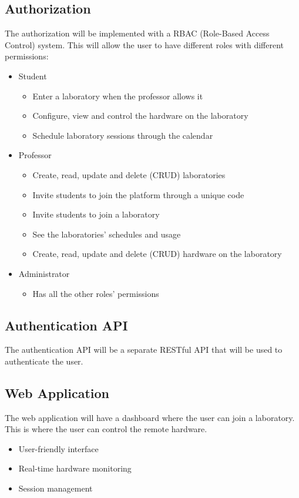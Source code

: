 \documentclass[a4paper,twoside,11pt]{article}
\begin{document}
\subsection*{Authorization}
The authorization will be implemented with a RBAC (Role-Based Access Control) system.
This will allow the user to have different roles with different permissions:
\begin{itemize}
    \item Student
	\begin{itemize}
		\item Enter a laboratory when the professor allows it
		\item Configure, view and control the hardware on the laboratory
		\item Schedule laboratory sessions through the calendar
	\end{itemize}
	\item Professor
	\begin{itemize}
		\item Create, read, update and delete (CRUD) laboratories
		\item Invite students to join the platform through a unique code
		\item Invite students to join a laboratory
		\item See the laboratories' schedules and usage
		\item Create, read, update and delete (CRUD) hardware on the laboratory
	\end{itemize}
	\item Administrator
	\begin{itemize}
		\item Has all the other roles' permissions
	\end{itemize}
\end{itemize}

\subsection*{Authentication API}
The authentication API will be a separate RESTful API that will be used to authenticate the user.

\subsection*{Web Application}
The web application will have a dashboard where the user can join a laboratory.
This is where the user can control the remote hardware.
\begin{itemize}
    \item User-friendly interface
    \item Real-time hardware monitoring
    \item Session management
\end{itemize}
\end{document}
